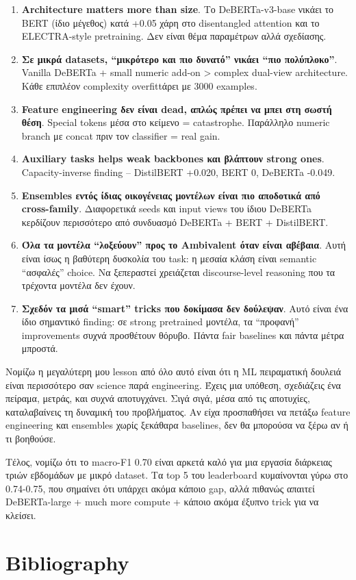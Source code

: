 \documentclass[12pt]{fphw}
\begin{document}
\begin{enumerate}
    \item \textbf{Architecture matters more than size}. Το DeBERTa-v3-base νικάει το BERT (ίδιο μέγεθος) κατά +0.05 χάρη στο disentangled attention και το ELECTRA-style pretraining. Δεν είναι θέμα παραμέτρων αλλά σχεδίασης.

    \item \textbf{Σε μικρά datasets, ``μικρότερο και πιο δυνατό'' νικάει ``πιο πολύπλοκο''}. Vanilla DeBERTa + small numeric add-on > complex dual-view architecture. Κάθε επιπλέον complexity overfittάρει με 3000 examples.

    \item \textbf{Feature engineering δεν είναι dead, απλώς πρέπει να μπει στη σωστή θέση}. Special tokens μέσα στο κείμενο = catastrophe. Παράλληλο numeric branch με concat πριν τον classifier = real gain.

    \item \textbf{Auxiliary tasks helps weak backbones και βλάπτουν strong ones}. Capacity-inverse finding -- DistilBERT +0.020, BERT 0, DeBERTa -0.049.

    \item \textbf{Ensembles εντός ίδιας οικογένειας μοντέλων είναι πιο αποδοτικά από cross-family}. Διαφορετικά seeds και input views του ίδιου DeBERTa κερδίζουν περισσότερο από συνδυασμό DeBERTa + BERT + DistilBERT.

    \item \textbf{Όλα τα μοντέλα ``λοξεύουν'' προς το Ambivalent όταν είναι αβέβαια}. Αυτή είναι ίσως η βαθύτερη δυσκολία του task: η μεσαία κλάση είναι semantic ``ασφαλές'' choice. Να ξεπεραστεί χρειάζεται discourse-level reasoning που τα τρέχοντα μοντέλα δεν έχουν.

    \item \textbf{Σχεδόν τα μισά ``smart'' tricks που δοκίμασα δεν δούλεψαν}. Αυτό είναι ένα ίδιο σημαντικό finding: σε strong pretrained μοντέλα, τα ``προφανή'' improvements συχνά προσθέτουν θόρυβο. Πάντα fair baselines και πάντα μέτρα μπροστά.
\end{enumerate}

Νομίζω η μεγαλύτερη μου lesson από όλο αυτό είναι ότι η ML πειραματική δουλειά είναι περισσότερο σαν science παρά engineering. Έχεις μια υπόθεση, σχεδιάζεις ένα πείραμα, μετράς, και συχνά αποτυγχάνει. Σιγά σιγά, μέσα από τις αποτυχίες, καταλαβαίνεις τη δυναμική του προβλήματος. Αν είχα προσπαθήσει να πετάξω feature engineering και ensembles χωρίς ξεκάθαρα baselines, δεν θα μπορούσα να ξέρω αν ή τι βοηθούσε.

Τέλος, νομίζω ότι το macro-F1 0.70 είναι αρκετά καλό για μια εργασία διάρκειας τριών εβδομάδων με μικρό dataset. Τα top 5 του leaderboard κυμαίνονται γύρω στο 0.74-0.75, που σημαίνει ότι υπάρχει ακόμα κάποιο gap, αλλά πιθανώς απαιτεί DeBERTa-large + much more compute + κάποιο ακόμα έξυπνο trick για να κλείσει.

\section{Bibliography}



\end{document}
